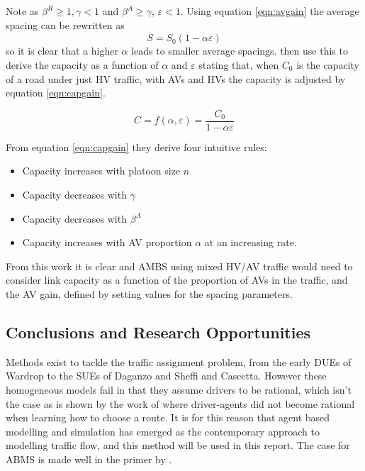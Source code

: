 \documentclass[12pt, a4paper, onecolumn]{article}
\begin{document}
Note as $\beta^R \geq 1, \gamma < 1$ and $\beta^A \geq \gamma$, $\varepsilon < 1$. Using equation \ref{eqn:avgain} the average spacing can be rewritten as
$$
\bar{S} = S_0 (1 - \alpha \varepsilon)
$$
so it is clear that a higher $\alpha$ leads to smaller average spacings. \citeauthor{chen2017} then use this to derive the capacity as a function of $\alpha$ and $\varepsilon$ stating that, when $C_0$ is the capacity of a road under just HV traffic, with AVs and HVs the capacity is adjusted by equation \ref{eqn:capgain}.

\begin{equation}
	C = f(\alpha, \varepsilon) = \frac{C_0}{1 - \alpha \varepsilon} 	
	\label{eqn:capgain}
	\end{equation}

From equation \ref{eqn:capgain} they derive four intuitive rules:

\begin{itemize}
	\item Capacity increases with platoon size $n$
	\item Capacity decreases with $\gamma$
	\item Capacity decreases with $\beta^A$
	\item Capacity increases with AV proportion $\alpha$ at an increasing rate.
	\end{itemize}

From this work it is clear and AMBS using mixed HV/AV traffic would need to consider link capacity as a function of the proportion of AVs in the traffic, and the AV gain, defined by setting values for the spacing parameters.

\subsection{Conclusions and Research Opportunities}
Methods exist to tackle the traffic assignment problem, from the early DUEs of Wardrop to the SUEs of Daganzo and Sheffi and Cascetta. However these homogeneous models fail in that they assume drivers to be rational, which isn't the case as is shown by the work of \cite{Nakayama2001} where driver-agents did not become rational when learning how to choose a route. It is for this reason that agent based modelling and simulation has emerged as the contemporary approach to modelling traffic flow, and this method will be used in this report. The case for ABMS is made well in the primer by \cite{Zheng2013}.
\end{document}
